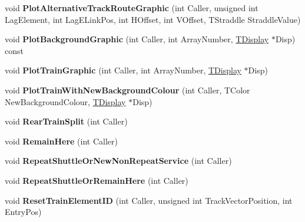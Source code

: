 \begin{DoxyCompactItemize}
\item 
\mbox{\label{class_t_train_aa21e18b3085773ca8351c446911611c1}} 
void {\bfseries Plot\+Alternative\+Track\+Route\+Graphic} (int Caller, unsigned int Lag\+Element, int Lag\+E\+Link\+Pos, int H\+Offset, int V\+Offset, T\+Straddle Straddle\+Value)
\item 
\mbox{\label{class_t_train_abb6bb7d2024ac59230cbaff2ec3ee999}} 
void {\bfseries Plot\+Background\+Graphic} (int Caller, int Array\+Number, \mbox{\hyperlink{class_t_display}{T\+Display}} $\ast$Disp) const
\item 
\mbox{\label{class_t_train_a247bd95a7c648367736b116f553f4e54}} 
void {\bfseries Plot\+Train\+Graphic} (int Caller, int Array\+Number, \mbox{\hyperlink{class_t_display}{T\+Display}} $\ast$Disp)
\item 
\mbox{\label{class_t_train_abfa6da75d034c737d53819e6edbfa3dc}} 
void {\bfseries Plot\+Train\+With\+New\+Background\+Colour} (int Caller, T\+Color New\+Background\+Colour, \mbox{\hyperlink{class_t_display}{T\+Display}} $\ast$Disp)
\item 
\mbox{\label{class_t_train_ad64c5823265b0c611c2e5f0613317aa5}} 
void {\bfseries Rear\+Train\+Split} (int Caller)
\item 
\mbox{\label{class_t_train_abd68a68b5ce295ee01171615f3d2c7ec}} 
void {\bfseries Remain\+Here} (int Caller)
\item 
\mbox{\label{class_t_train_a8262f447ec811db7e524c7bb885226c5}} 
void {\bfseries Repeat\+Shuttle\+Or\+New\+Non\+Repeat\+Service} (int Caller)
\item 
\mbox{\label{class_t_train_ac6f5cda912103fda4da31bdca611e4b5}} 
void {\bfseries Repeat\+Shuttle\+Or\+Remain\+Here} (int Caller)
\item 
\mbox{\label{class_t_train_ace302d98b5685104d294869b161e20a0}} 
void {\bfseries Reset\+Train\+Element\+ID} (int Caller, unsigned int Track\+Vector\+Position, int Entry\+Pos)
\item 
\mbox{\label{class_t_train_a594228489e522dfde0ffbe124cd27103}} 

\end{DoxyCompactItemize}
